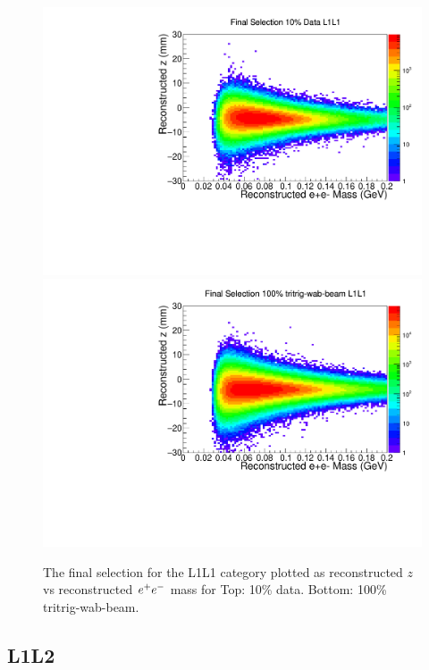 \begin{figure}[!ht] 
    \centering
    \includegraphics[width=.85\textwidth]{figs/selection/data_L1L1_final_vz_mass.pdf}
    \includegraphics[width=.85\textwidth]{figs/selection/mc_L1L1_final_vz_mass.pdf}
    \caption{
    	The final selection for the L1L1 category plotted as reconstructed $z$ vs reconstructed $e^{+}e^{-}$ mass for Top: 10\% data. Bottom: 100\% tritrig-wab-beam.
    }
    \label{fig:singleV0_2D}
\end{figure}

\clearpage

\subsection{L1L2}\label{sec:apL1L2}

